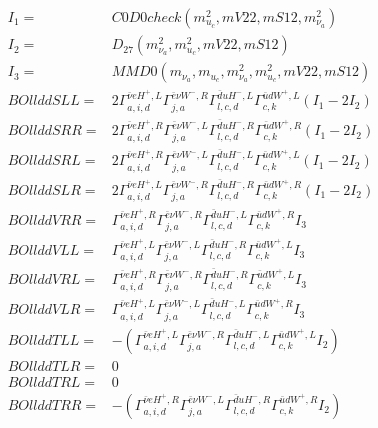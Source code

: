 \documentclass[A4,landscape]{article}
\begin{document}
\begin{align} 
I_1 = & C0D0check(m^2_{u_{{c}}}, mV22, mS12, m^2_{\nu_{{a}}}) \\ 
I_2 = & D_{27}(m^2_{\nu_{{a}}}, m^2_{u_{{c}}}, mV22, mS12) \\ 
I_3 = & MMD0(m_{\nu_{{a}}}, m_{u_{{c}}}, m^2_{\nu_{{a}}}, m^2_{u_{{c}}}, mV22, mS12) \\ 
  BOllddSLL= & 2  \Gamma^{\bar{\nu}e H^+,L}_{a, i, d} \Gamma^{\bar{e}\nu W^- ,R}_{j, a} \Gamma^{\bar{d}u H^- ,L}_{l, c, d} \Gamma^{\bar{u}d W^+,L}_{c, k} (I_1 - 2 I_2) \\ 
  BOllddSRR= & 2  \Gamma^{\bar{\nu}e H^+,R}_{a, i, d} \Gamma^{\bar{e}\nu W^- ,L}_{j, a} \Gamma^{\bar{d}u H^- ,R}_{l, c, d} \Gamma^{\bar{u}d W^+,R}_{c, k} (I_1 - 2 I_2) \\ 
  BOllddSRL= & 2  \Gamma^{\bar{\nu}e H^+,R}_{a, i, d} \Gamma^{\bar{e}\nu W^- ,L}_{j, a} \Gamma^{\bar{d}u H^- ,L}_{l, c, d} \Gamma^{\bar{u}d W^+,L}_{c, k} (I_1 - 2 I_2) \\ 
  BOllddSLR= & 2  \Gamma^{\bar{\nu}e H^+,L}_{a, i, d} \Gamma^{\bar{e}\nu W^- ,R}_{j, a} \Gamma^{\bar{d}u H^- ,R}_{l, c, d} \Gamma^{\bar{u}d W^+,R}_{c, k} (I_1 - 2 I_2) \\ 
  BOllddVRR= &  \Gamma^{\bar{\nu}e H^+,R}_{a, i, d} \Gamma^{\bar{e}\nu W^- ,R}_{j, a} \Gamma^{\bar{d}u H^- ,L}_{l, c, d} \Gamma^{\bar{u}d W^+,R}_{c, k} I_3 \\ 
  BOllddVLL= &  \Gamma^{\bar{\nu}e H^+,L}_{a, i, d} \Gamma^{\bar{e}\nu W^- ,L}_{j, a} \Gamma^{\bar{d}u H^- ,R}_{l, c, d} \Gamma^{\bar{u}d W^+,L}_{c, k} I_3 \\ 
  BOllddVRL= &  \Gamma^{\bar{\nu}e H^+,R}_{a, i, d} \Gamma^{\bar{e}\nu W^- ,R}_{j, a} \Gamma^{\bar{d}u H^- ,R}_{l, c, d} \Gamma^{\bar{u}d W^+,L}_{c, k} I_3 \\ 
  BOllddVLR= &  \Gamma^{\bar{\nu}e H^+,L}_{a, i, d} \Gamma^{\bar{e}\nu W^- ,L}_{j, a} \Gamma^{\bar{d}u H^- ,L}_{l, c, d} \Gamma^{\bar{u}d W^+,R}_{c, k} I_3 \\ 
  BOllddTLL= & -( \Gamma^{\bar{\nu}e H^+,L}_{a, i, d} \Gamma^{\bar{e}\nu W^- ,R}_{j, a} \Gamma^{\bar{d}u H^- ,L}_{l, c, d} \Gamma^{\bar{u}d W^+,L}_{c, k} I_2) \\ 
  BOllddTLR= & 0 \\ 
  BOllddTRL= & 0 \\ 
  BOllddTRR= & -( \Gamma^{\bar{\nu}e H^+,R}_{a, i, d} \Gamma^{\bar{e}\nu W^- ,L}_{j, a} \Gamma^{\bar{d}u H^- ,R}_{l, c, d} \Gamma^{\bar{u}d W^+,R}_{c, k} I_2) \\ 
\end{align} 
\end{document}
